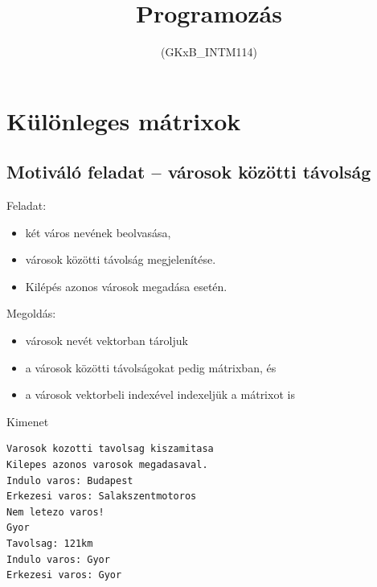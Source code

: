 \documentclass[usenames,dvipsnames,aspectratio=169]{beamer}
\title[9. előadás]{Programozás}
\subtitle{(GKxB\_INTM114)}
\begin{document}
\begin{frame}[plain]
  \titlepage
  \logoalul
\end{frame}

\section{Különleges mátrixok}
\subsection{Motiváló feladat -- városok közötti távolság}
\begin{frame}
  Feladat:
  \begin{itemize}
    \item két város nevének beolvasása,
    \item városok közötti távolság megjelenítése.
    \item Kilépés azonos városok megadása esetén.
  \end{itemize}
  \vfill
  Megoldás:
  \begin{itemize}
    \item városok nevét vektorban tároljuk
    \item a városok közötti távolságokat pedig mátrixban, és
    \item a városok vektorbeli indexével indexeljük a mátrixot is
  \end{itemize}
\end{frame}

\begin{frame}[fragile]
  \begin{block}{Kimenet}
    \begin{verbatim}
Varosok kozotti tavolsag kiszamitasa
Kilepes azonos varosok megadasaval.
Indulo varos: Budapest
Erkezesi varos: Salakszentmotoros
Nem letezo varos!
Gyor
Tavolsag: 121km
Indulo varos: Gyor
Erkezesi varos: Gyor
\end{verbatim}
  \end{block}
\end{frame}

\begin{frame}
  \begin{exampleblock}{}
    \footnotesize
    
  \end{exampleblock}
\end{frame}

\begin{frame}
  \begin{exampleblock}{}
    \scriptsize
    \vspace{-.2cm}
    
    \vspace{-.2cm}
  \end{exampleblock}
\end{frame}
\end{document}
